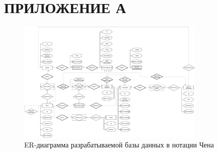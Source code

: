 \section*{ПРИЛОЖЕНИЕ А}

% 

\begin{figure}[H]
	\centering
	\includegraphics[angle=90,width=0.8\textwidth]{diag/chen-erd.pdf}
	\caption{ER-диаграмма разрабатываемой базы данных в нотации Чена}
	\label{fig:chen-erd}
\end{figure}
